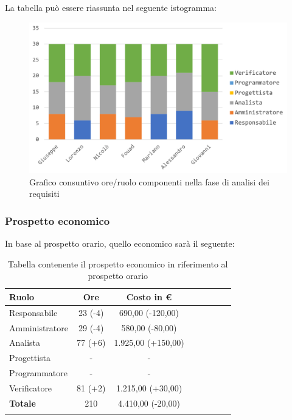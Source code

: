 			La tabella può essere riassunta nel seguente istogramma:
			
			\begin{figure}[H]
				\centering
				\includegraphics[width=0.8\linewidth]{images/consuntivo/analisiCons1.png}
				\caption{Grafico consuntivo ore/ruolo componenti nella fase di analisi dei requisiti}
				\label{fig:consuntivo grafico suddivisione ruoli fase analisi dei requisiti}
			\end{figure}
			
		\subsubsection{Prospetto economico}
			In base al prospetto orario, quello economico sarà il seguente: 
			
			\begin{longtable}{|l|c|c|c|c|c|c|c}
				\hline
				\rowcolor{lighter-grayer}
				\textbf{Ruolo} & \textbf{Ore} & \textbf{Costo in €} \\
				\hline
				\endfirsthead
				
				\hline
				Responsabile & 23 (-4) & 690,00 (-120,00)\\
				\hline
				\hline
				Amministratore & 29 (-4) & 580,00 (-80,00)\\
				\hline
				\hline
				Analista & 77 (+6) & 1.925,00 (+150,00)\\
				\hline
				\hline
				Progettista & - & -\\
				\hline
				\hline
				Programmatore & - & -\\
				\hline
				\hline
				Verificatore & 81 (+2) & 1.215,00 (+30,00)\\
				\hline
				\textbf{Totale} & 210 & 4.410,00 (-20,00)\\
				\hline
				\caption{Tabella contenente il prospetto economico in riferimento al prospetto orario}
			\end{longtable}
			\pagebreak
			
